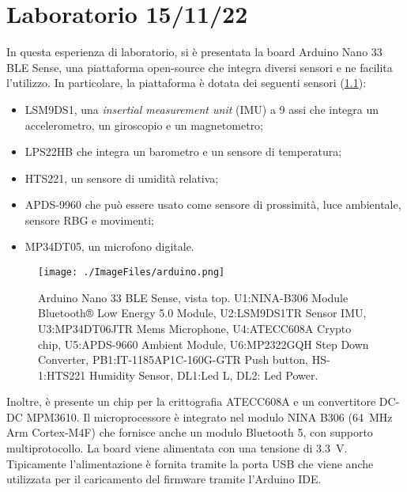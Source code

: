\chapter{Laboratorio 15/11/22}
In questa esperienza di laboratorio, si è presentata la board Arduino Nano 33 BLE Sense, una piattaforma open-source che integra diversi sensori e ne facilita l'utilizzo. In particolare, la piattaforma è dotata dei seguenti sensori (\Fig\ref{fig:arduino}):
\begin{itemize}
	\item LSM9DS1, una \textit{insertial measurement unit} (IMU) a 9 assi che integra un accelerometro, un giroscopio e un magnetometro;
	\item LPS22HB che integra un barometro e un sensore di temperatura;
	\item HTS221, un sensore di umidità relativa;
	\item APDS-9960 che può essere usato come sensore di prossimità, luce ambientale, sensore RBG e movimenti;
	\item MP34DT05, un microfono digitale.
\end{itemize}
\begin{figure}[b!]
	\centering
	\texttt{[image: ./ImageFiles/arduino.png]}
	\caption{Arduino Nano 33 BLE Sense, vista top. U1:NINA-B306 Module Bluetooth® Low Energy 5.0 Module, U2:LSM9DS1TR Sensor IMU, U3:MP34DT06JTR Mems Microphone, U4:ATECC608A Crypto chip, U5:APDS-9660 Ambient Module, U6:MP2322GQH Step Down Converter, PB1:IT-1185AP1C-160G-GTR Push button, HS-1:HTS221 Humidity Sensor, DL1:Led L, DL2: Led Power.}
	\label{fig:arduino}
\end{figure}
Inoltre, è presente un chip per la crittografia ATECC608A e un convertitore DC-DC MPM3610. Il microprocessore è integrato nel modulo NINA B306 (\SI{64}{\mega\hertz} Arm Cortex-M4F) che fornisce anche un modulo Bluetooth 5, con supporto multiprotocollo. La board viene alimentata con una tensione di \SI{3.3}{\volt}. Tipicamente l'alimentazione è fornita tramite la porta USB che viene anche utilizzata per il caricamento del firmware tramite l'Arduino IDE.